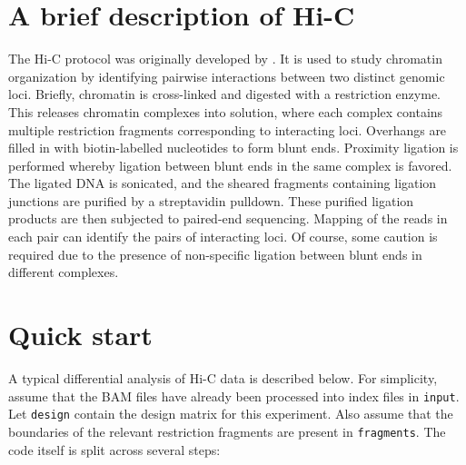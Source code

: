 \documentclass[12pt]{report}
\newcommand{\code}[1]{{\small\texttt{#1}}}
\begin{document}
\section{A brief description of Hi-C}
The Hi-C protocol was originally developed by \cite{lieberman2009comprehensive}.
It is used to study chromatin organization by identifying pairwise interactions between two distinct genomic loci.
Briefly, chromatin is cross-linked and digested with a restriction enzyme.
This releases chromatin complexes into solution, where each complex contains multiple restriction fragments corresponding to interacting loci.
Overhangs are filled in with biotin-labelled nucleotides to form blunt ends.
Proximity ligation is performed whereby ligation between blunt ends in the same complex is favored.
The ligated DNA is sonicated, and the sheared fragments containing ligation junctions are purified by a streptavidin pulldown.
These purified ligation products are then subjected to paired-end sequencing.
Mapping of the reads in each pair can identify the pairs of interacting loci.
Of course, some caution is required due to the presence of non-specific ligation between blunt ends in different complexes.

\section{Quick start}
A typical differential analysis of Hi-C data is described below.
For simplicity, assume that the BAM files have already been processed into index files in \code{input}.
Let \code{design} contain the design matrix for this experiment.
Also assume that the boundaries of the relevant restriction fragments are present in \code{fragments}.
The code itself is split across several steps: 


\end{document}

